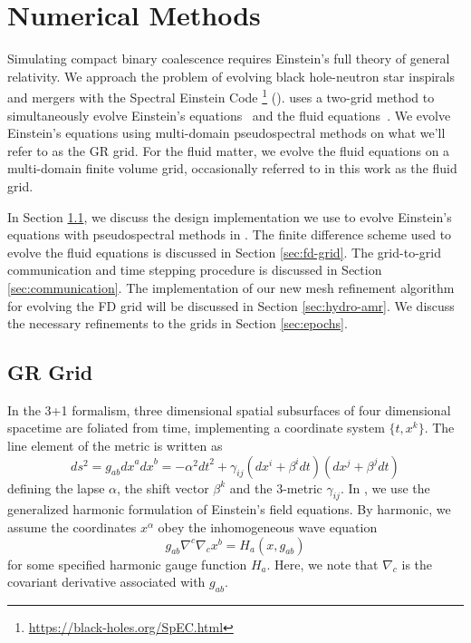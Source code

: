 \chapter{Numerical Methods}
\label{chap:chapter-3}
	
Simulating compact binary coalescence requires Einstein's full theory of general relativity.
We approach the problem of evolving black hole-neutron star inspirals and mergers with the Spectral Einstein Code
\footnote{\url{https://black-holes.org/SpEC.html}}
(\SpEC).  
\SpEC uses a two-grid method to simultaneously evolve Einstein's equations~\cite{Lindblom:2007,Szilagyi:2014fna} and the fluid equations~\cite{Duez:2008rb,Foucart:2013a}.
We evolve Einstein's equations using multi-domain pseudospectral methods on what we'll refer to as the GR grid.
For the fluid matter, we evolve the fluid equations on a multi-domain finite volume grid, occasionally referred to in this work as the fluid grid.

In Section \ref{sec:gr-grid}, we discuss the design implementation we use to evolve Einstein's equations with pseudospectral methods in \SpEC.  The finite difference scheme used to evolve the fluid equations is discussed in Section \ref{sec:fd-grid}.  The grid-to-grid communication and time stepping procedure is discussed in Section \ref{sec:communication}.  The implementation of our new mesh refinement algorithm for evolving the FD grid will be discussed in Section \ref{sec:hydro-amr}.  We discuss the necessary refinements to the grids in Section \ref{sec:epochs}.

\section{GR Grid}
\label{sec:gr-grid}

In the 3+1 formalism, three dimensional spatial subsurfaces of four dimensional spacetime are foliated from time, implementing a coordinate system $\{t, x^k\}$.  The line element of the metric is written as
\begin{equation}
ds^2 = g_{ab} {dx}^a {dx}^b = -\alpha^2 {dt}^2 + \gamma_{ij} (dx^i + \beta^i dt) (dx^j + \beta^j dt)
\end{equation} 
defining the lapse $\alpha$, the shift vector $\beta^k$ and the 3-metric $\gamma_{ij}$. 
In \SpEC, we use the generalized harmonic formulation of Einstein's field equations.  By harmonic, we assume the coordinates $x^\alpha$ obey the inhomogeneous  wave equation
\begin{equation}
g_{ab} \nabla^c \nabla_c x^b = H_a (x, g_{ab})
\end{equation}
for some specified harmonic gauge function $H_a$.  Here, we note that $\nabla_c$ is the covariant derivative associated with $g_{ab}$.  



